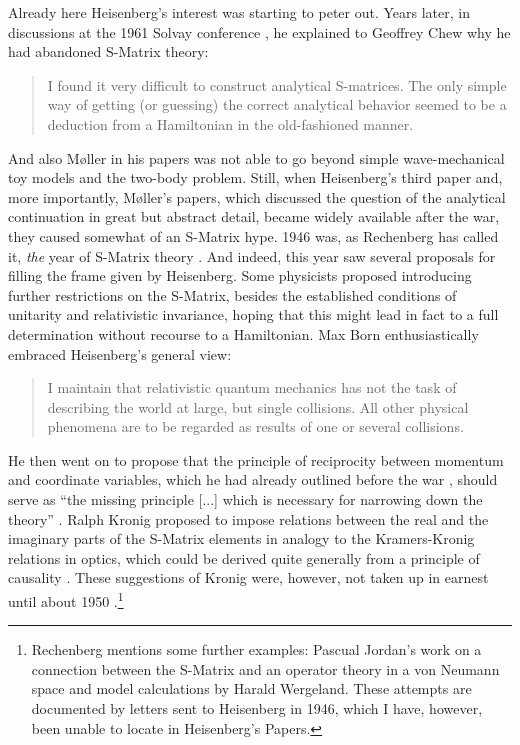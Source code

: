 \documentclass[12pt]{article}
\begin{document}
Already here Heisenberg's interest was starting to peter out. Years later, in discussions at the 1961 Solvay conference \citep[p.174]{solvay_1961_la-theorie}, he explained to Geoffrey Chew why he had abandoned S-Matrix theory:

\begin{quote}
I found it very difficult to construct analytical S-matrices. The only simple way of getting (or guessing) the correct analytical behavior seemed to be a deduction from a Hamiltonian in the old-fashioned manner.
\end{quote}

And also M\o ller in his papers was not able to go beyond simple wave-mechanical toy models and the two-body problem. Still, when Heisenberg's third paper and, more importantly, M\o ller's papers, which discussed the question of the analytical continuation in great but abstract detail, became widely available after the war, they caused somewhat of an S-Matrix hype. 1946 was, as Rechenberg has called it, \emph{the} year of S-Matrix theory \citep[p. 564]{rechenberg_1989_the-early}. And indeed, this year saw several proposals for filling the frame given by Heisenberg. Some physicists proposed introducing further restrictions on the S-Matrix, besides the established conditions of unitarity and relativistic invariance, hoping that this might lead in fact to a full determination without recourse to a Hamiltonian. Max Born enthusiastically embraced Heisenberg's general view:

\begin{quote}
I maintain that relativistic quantum mechanics has not the task of describing the world at large, but single collisions. All other physical phenomena are to be regarded as results of one or several collisions. \citep[p. 15]{born_1947_relativistic}
\end{quote}

He then went on to propose that the principle of reciprocity between momentum and coordinate variables, which he had already outlined before the war \citep{born_1938_a-suggestion}, should serve as ``the missing principle [...] which is necessary for narrowing down the theory'' \citep[p. 17]{born_1947_relativistic}. Ralph Kronig proposed to impose relations between the real and the imaginary parts of the S-Matrix elements in analogy to the Kramers-Kronig relations in optics, which could be derived quite generally from a principle of causality \citep{kronig_1946_a-supplementary}. These suggestions of Kronig were, however, not taken up in earnest until about 1950 \citep[p. 57ff]{cushing_1990_theory}.\footnote{Rechenberg mentions some further examples: Pascual Jordan's work on a connection between the S-Matrix and an operator theory in a von Neumann space and model calculations by Harald Wergeland. These attempts are documented by letters sent to Heisenberg in 1946, which I have, however, been unable to locate in Heisenberg's Papers.}
\end{document}
